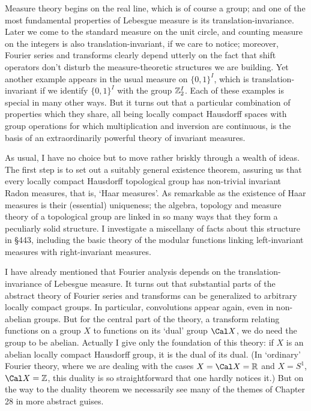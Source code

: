 
\def\chaptername{Topological groups}
\def\sectionname{Introduction}


Measure theory begins on the real line, which is of course a group;  and
one of the most fundamental properties of Lebesgue measure is its
translation-invariance.   Later we come to the standard
measure on the unit circle, and counting measure on the
integers is also translation-invariant, if we care to notice;  moreover,
Fourier series and transforms clearly depend utterly
on the fact that shift operators don't disturb the measure-theoretic
structures we are building.   Yet another example appears in the usual
measure on $\{0,1\}^I$, which is translation-invariant if we identify
$\{0,1\}^I$ with the group $\Bbb Z_2^I$.   Each of
these examples is special in many other ways.   But it turns out that
a particular combination of properties which they share,
all being locally
compact Hausdorff spaces with group operations for which multiplication
and inversion are continuous, is the basis of an extraordinarily
powerful theory of invariant measures.

As usual, I have no choice but to move rather briskly through a wealth
of ideas.   The first step is to set out a suitably general existence
theorem, assuring us that every locally compact Hausdorff topological
group has non-trivial invariant Radon measures, that is, `Haar
measures'.   As remarkable as the existence of
Haar measures is their (essential) uniqueness;  the
algebra, topology and measure theory of a topological group are linked
in so many ways that they form a peculiarly solid structure.
I investigate a miscellany of facts about this structure in \S443,
including the basic theory of the modular functions linking left-invariant
measures with right-invariant measures.

I have already mentioned that Fourier analysis depends on the
translation-invariance of Lebesgue measure.   It turns out that
substantial parts of the abstract theory of Fourier series and
transforms can be generalized to arbitrary locally compact groups.   In
particular, convolutions appear again, even in
non-abelian groups.   But for the central part of the
theory, a transform relating functions on a group $X$ to functions on
its `dual' group $\Cal X$, we do need the group to be abelian.
Actually I give only the foundation of this theory:  if $X$ is an
abelian locally compact Hausdorff group, it is the dual of its
dual.   (In `ordinary' Fourier theory, where we are
dealing with the cases $X=\Cal X=\Bbb R$ and $X=S^1$, $\Cal X=\Bbb Z$,
this duality is so straightforward that one hardly notices it.)   But on
the way to the duality theorem we necessarily see many of the themes of
Chapter 28 in more abstract guises.


